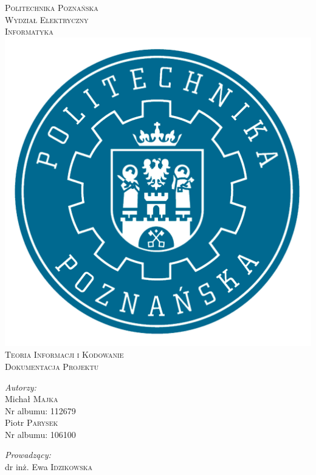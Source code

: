 \documentclass[12pt,a4paper,notitlepage]{report}
\begin{document}
\renewcommand{\lstlistingname}{Kod} %
\renewcommand\bibname{Literatura} %
\renewcommand{\tablename}{Tabela} %

\begin{titlepage}
\begin{center}

\textsc{\LARGE Politechnika Poznańska}\\[0.8cm]
\textsc{\Large Wydział Elektryczny \\ Informatyka}\\[1cm]

\includegraphics[scale=1]{logopoli}
\vspace{.5cm}\\
\textsc{\large Teoria Informacji i Kodowanie}\\[0.2cm]
\textsc{\normalsize Dokumentacja Projektu}\\[.5cm]


\noindent
\begin{minipage}[t]{0.4\textwidth}
\begin{flushleft} \large
\emph{Autorzy:}\\
Michał \textsc{Majka} \\
Nr albumu: 112679\\
Piotr \textsc{Parysek} \\
Nr albumu: 106100
\end{flushleft}
\end{minipage}%
\begin{minipage}[t]{0.4\textwidth}
\begin{flushright} \large
\emph{Prowadzący:} \\
dr inż. Ewa \textsc{Idzikowska}
\end{flushright}
\end{minipage}


\end{center}
\end{titlepage}
\end{document}
